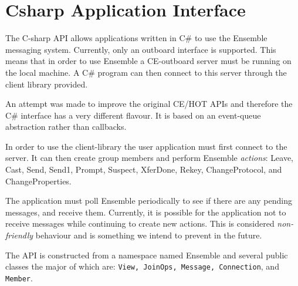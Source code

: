 %
%
%
\section{Csharp Application Interface}

The C-sharp API allows applications written in C\# to use the Ensemble
messaging system. Currently, only an outboard interface is
supported. This means that in order to use Ensemble a CE-outboard
server must be running on the local machine. A C\# program can then
connect to this server through the client library provided. 

An attempt was made to improve the original CE/HOT APIs and therefore
the C\# interface has a very different flavour. It is based on an
event-queue abstraction rather than callbacks. 

In order to use the client-library the user application must first
connect to the server. It can then create group members and perform
Ensemble {\it actions}: Leave, Cast, Send, Send1, Prompt, Suspect,
XferDone, Rekey, ChangeProtocol, and ChangeProperties.

The application must poll Ensemble periodically to see if there are any
pending messages, and receive them. Currently, it is possible
for the application not to receive messages while continuing to create
new actions. This is considered {\it non-friendly} behaviour and is something we
intend to prevent in the future. 


The API is constructed from a namespace named Ensemble and several
public classes the major of which are: {\tt View, JoinOps, Message,
  Connection}, and {\tt Member}. 

